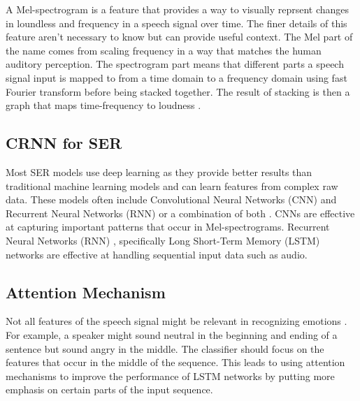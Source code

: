 \documentclass[../main.tex]{subfiles}
\begin{document}
A Mel-spectrogram is a feature that provides a way to visually reprsent changes in loundless 
and frequency in a speech signal over time. The finer details of this
feature aren't necessary to know but can provide useful context. The Mel part of the name comes 
from scaling frequency in a way that matches the human auditory perception. 
The spectrogram part means that different parts a speech 
signal input is mapped to from a time domain to a frequency domain using 
fast Fourier transform before being stacked together. The result of stacking is 
then a graph that maps time-frequency to loudness \citep{Roberts2020}. 

\subsection{CRNN for SER} 
Most SER models use deep learning as they provide 
better results than traditional machine learning models and can learn features 
from complex raw data. These models often include Convolutional Neural Networks 
(CNN) and Recurrent Neural Networks (RNN) or a combination of both \citep{Hashem2023}. CNNs are 
effective at capturing important patterns that occur in Mel-spectrograms. 
Recurrent Neural Networks (RNN) , specifically Long Short-Term Memory (LSTM) 
networks are effective at handling sequential input data such as audio.

\subsection{Attention Mechanism} 
Not all features of the speech signal might 
be relevant in recognizing emotions \citep{Hashem2023}. For example, a speaker might sound neutral 
in the beginning and ending of a sentence but sound angry in the middle. The 
classifier should focus on the features that occur in the middle of the 
sequence. This leads to using attention mechanisms to improve the performance 
of LSTM networks by putting more emphasis on certain parts of the input 
sequence.
\end{document}
